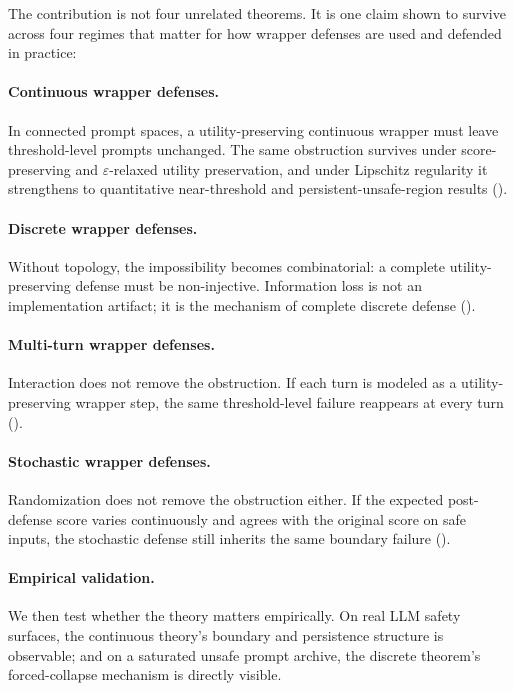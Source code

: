 \documentclass[11pt]{article}
\begin{document}
The contribution is not four unrelated theorems. It is one claim shown
to survive across four regimes that matter for how wrapper defenses are
used and defended in practice:

\paragraph{Continuous wrapper defenses.}
In connected prompt spaces, a utility-preserving continuous wrapper
must leave threshold-level prompts unchanged. The same obstruction
survives under score-preserving and $\varepsilon$-relaxed utility
preservation, and under Lipschitz regularity it strengthens to
quantitative near-threshold and persistent-unsafe-region results
().

\paragraph{Discrete wrapper defenses.}
Without topology, the impossibility becomes combinatorial: a complete
utility-preserving defense must be non-injective. Information loss is
not an implementation artifact; it is the mechanism of complete
discrete defense ().

\paragraph{Multi-turn wrapper defenses.}
Interaction does not remove the obstruction. If each turn is modeled as
a utility-preserving wrapper step, the same threshold-level failure
reappears at every turn ().

\paragraph{Stochastic wrapper defenses.}
Randomization does not remove the obstruction either. If the expected
post-defense score varies continuously and agrees with the original
score on safe inputs, the stochastic defense still inherits the same
boundary failure ().

\paragraph{Empirical validation.}
We then test whether the theory matters empirically. On real LLM safety
surfaces, the continuous theory's boundary and persistence structure is
observable; and on a saturated unsafe prompt archive, the discrete
theorem's forced-collapse mechanism is directly visible.
\end{document}
